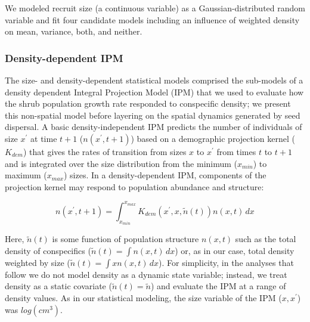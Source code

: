\documentclass[11pt]{article}\usepackage[]{graphicx}\usepackage[usenames,dvipsnames]{xcolor}
\begin{document}
We modeled recruit size (a continuous variable) as a Gaussian-distributed random variable and fit four candidate models including an influence of weighted density on mean, variance, both, and neither. 

\subsubsection*{Density-dependent IPM}
The size- and density-dependent statistical models comprised the sub-models of a density dependent Integral Projection Model (IPM) that we used to evaluate how the shrub population growth rate responded to conspecific density; we present this non-spatial model before layering on the spatial dynamics generated by seed dispersal. 
A basic density-independent IPM predicts the number of individuals of size $x^\prime$ at time $t+1$ ($n(x^\prime,t + 1)$) based on a demographic projection kernel ($K_{dem}$) that gives the rates of transition from sizes $x$ to $x^\prime$ from times $t$ to $t+1$ and is integrated over the size distribution from the minimum ($x_{min}$) to maximum ($x_{max}$) sizes. In a density-dependent IPM, components of the projection kernel may respond to population abundance and structure:
\begin{linenomath*} 
\begin{equation} \label{eq:DDIPM}
n(x^\prime,t + 1) = \int_{x_{min}}^{x_{max}} K_{dem}(x^\prime,x,\tilde{n}(t)) n(x,t) \,dx 
\end{equation} 
\end{linenomath*}
Here, $\tilde{n}(t)$ is some function of population structure $n(x,t)$ such as the total density of conspecifics ($\tilde{n}(t)=\int n(x,t) \,dx$) or, as in our case, total density weighted by size ($\tilde{n}(t)=\int x n(x,t) \,dx$). 
For simplicity, in the analyses that follow we do not model density as a dynamic state variable; instead, we treat density as a static covariate ($\tilde{n}(t)=\tilde{n}$) and evaluate the IPM at a range of density values. 
As in our statistical modeling, the size variable of the IPM ($x,x^\prime$) was $log(cm^3)$.
\end{document}
